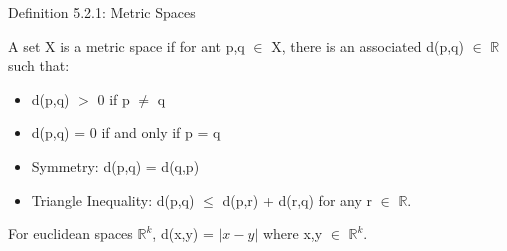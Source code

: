{ \color{blue} Definition 5.2.1: Metric Spaces } 

	\begin{adjustbox}{minipage=14cm, right}
		A set X is a metric space if for ant p,q $\in$ X, there is an associated d(p,q) $\in$
		$\mathbb{R}$ such that:	
		\begin{itemize}[leftmargin=1cm]
			\item d(p,q) $>$ 0 \qquad \qquad if p $\neq$ q
			\item d(p,q) = 0 if and only if p = q
			\item {\color{lblue} Symmetry}:
				d(p,q) = d(q,p)
			\item {\color{lblue} Triangle Inequality}:
				d(p,q) $\leq$ d(p,r) + d(r,q) \qquad \qquad for any r $\in$ $\mathbb{R}$.
		\end{itemize}

		For euclidean spaces $\mathbb{R}^k$, d(x,y) = $| x - y |$ where x,y $\in$ $\mathbb{R}^k$. \\
	\end{adjustbox}


